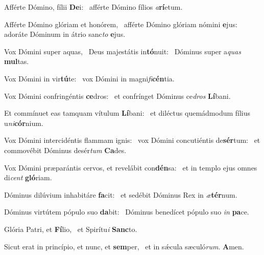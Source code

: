 \item Afférte Dómino, fílii \textbf{De}i:~\psstar{} afférte Dómino fílios \textit{a}\textbf{rí}etum.
\item Afférte Dómino glóriam et honórem,~\pscross{} afférte Dómino glóriam nómini \textbf{e}jus:~\psstar{} adoráte Dóminum in átrio sanc\textit{to} \textbf{e}jus.
\item Vox Dómini super aquas,~\pscross{} Deus majestátis in\textbf{tó}nuit:~\psstar{} Dóminus super a\textit{quas} \textbf{mul}tas.
\item Vox Dómini in vir\textbf{tú}te:~\psstar{} vox Dómini in magni\textit{fi}\textbf{cén}tia.
\item Vox Dómini confringéntis \textbf{ce}dros:~\psstar{} et confrínget Dóminus ce\textit{dros} \textbf{Lí}bani.
\item Et commínuet eas tamquam vítulum \textbf{Lí}bani:~\psstar{} et diléctus quemádmodum fílius u\textit{ni}\textbf{cór}nium.
\item Vox Dómini intercidéntis flammam ignis:~\pscross{} vox Dómini concutiéntis de\textbf{sér}tum:~\psstar{} et commovébit Dóminus desér\textit{tum} \textbf{Ca}des.
\item Vox Dómini præparántis cervos, et revelábit con\textbf{dén}sa:~\psstar{} et in templo ejus omnes di\textit{cent} \textbf{gló}riam.
\item Dóminus dilúvium inhabitáre \textbf{fa}cit:~\psstar{} et sedébit Dóminus Rex in \textit{æ}\textbf{tér}num.
\item Dóminus virtútem pópulo suo \textbf{da}bit:~\psstar{} Dóminus benedícet pópulo suo \textit{in} \textbf{pa}ce.
\item Glória Patri, et \textbf{Fí}lio,~\psstar{} et Spirítu\textit{i} \textbf{Sanc}to.
\item Sicut erat in princípio, et nunc, et \textbf{sem}per,~\psstar{} et in sǽcula sæculó\textit{rum}. \textbf{A}men.
